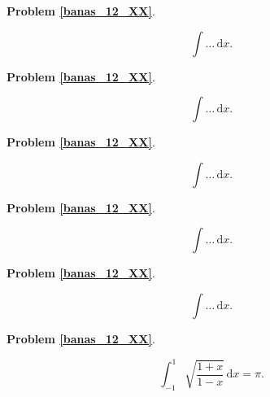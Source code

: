 \textbf{Problem \ref{banas_12_XX}}.

\begin{problem_with_solution}
    \label{banas_12_XX}%
    \begin{equation}
        \int \ldots \, \mathrm{d}x.
    \end{equation}
\end{problem_with_solution}

\textbf{Problem \ref{banas_12_XX}}.

\begin{problem_with_solution}
    \label{banas_12_XX}%
    \begin{equation}
        \int \ldots \, \mathrm{d}x.
    \end{equation}
\end{problem_with_solution}

\textbf{Problem \ref{banas_12_XX}}.

\begin{problem_with_solution}
    \label{banas_12_XX}%
    \begin{equation}
        \int \ldots \, \mathrm{d}x.
    \end{equation}
\end{problem_with_solution}

\textbf{Problem \ref{banas_12_XX}}.

\begin{problem_with_solution}
    \label{banas_12_XX}%
    \begin{equation}
        \int \ldots \, \mathrm{d}x.
    \end{equation}
\end{problem_with_solution}

\textbf{Problem \ref{banas_12_XX}}.

\begin{problem_with_solution}
    \label{banas_12_XX}%
    \begin{equation}
        \int \ldots \, \mathrm{d}x.
    \end{equation}
\end{problem_with_solution}

\textbf{Problem \ref{banas_12_XX}}.

\begin{problem_with_solution}
    \label{nahin_1x_1x}%
    \begin{equation}
        \int_{-1}^1 \sqrt{\frac{1+x}{1-x}} \,\mathrm{d}x = \pi.
    \end{equation}
\end{problem_with_solution}

